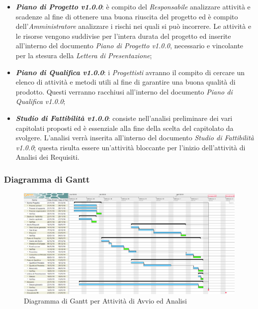 \begin{itemize}
	\item \textbf{\textit{Piano di Progetto v1.0.0}}: è compito del \textit{Responsabile} analizzare attività e scadenze al fine di ottenere una buona riuscita del progetto ed è compito dell'\textit{Amministratore} analizzare i rischi nei quali si può incorrere. Le attività e le risorse vengono suddivise per l'intera durata del progetto ed inserite all'interno del documento \textit{Piano di Progetto v1.0.0}, necessario e vincolante per la stesura della \textit{Lettera di Presentazione};
	\item \textbf{\textit{Piano di Qualifica v1.0.0}}: i \textit{Progettisti} avranno il compito di cercare un elenco di attività e metodi utili al fine di garantire una buona qualità di prodotto. Questi verranno racchiusi all'interno del documento \textit{Piano di Qualifica v1.0.0};
	\item \textbf{\textit{Studio di Fattibilità v1.0.0}}: consiste nell'analisi preliminare dei vari capitolati proposti ed è essenziale alla fine della scelta del capitolato da svolgere. L'analisi verrà inserita all'interno del documento \textit{Studio di Fattibilità v1.0.0}; questa risulta essere un'attività bloccante per l'inizio dell'attività di Analisi dei Requisiti.  
\end{itemize}
\newpage
\begin{landscape}
\subsubsection{Diagramma di Gantt}
\begin{figure}[H]
	\centering
  		\includegraphics[width=1.0\linewidth]{./images/AvvioAnalisi.png}
  		\caption{Diagramma di Gantt per Attività di Avvio ed Analisi}
  		\label{fig:Gantt Avvio ed Analisi}
\end{figure}
\end{landscape}
\newpage


